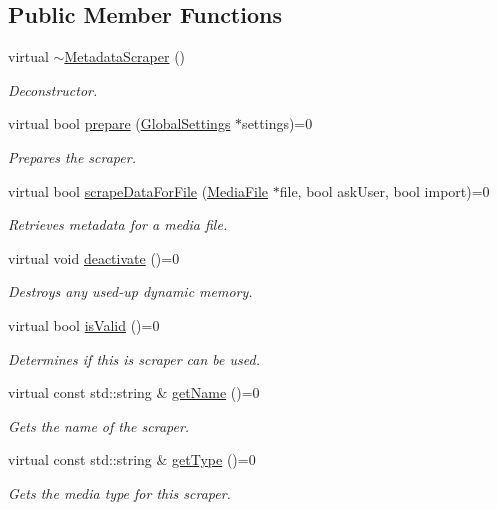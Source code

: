\subsection*{Public Member Functions}
\begin{DoxyCompactItemize}
\item 
\hypertarget{class_a_w_e_1_1_metadata_scraper_a0a7ae0178e838b07bbd960be7c9e7dac}{virtual \hyperlink{class_a_w_e_1_1_metadata_scraper_a0a7ae0178e838b07bbd960be7c9e7dac}{$\sim$\-Metadata\-Scraper} ()}\label{class_a_w_e_1_1_metadata_scraper_a0a7ae0178e838b07bbd960be7c9e7dac}

\begin{DoxyCompactList}\small\item\em Deconstructor. \end{DoxyCompactList}\item 
virtual bool \hyperlink{class_a_w_e_1_1_metadata_scraper_a92f9039770add633140b825bf41bc30a}{prepare} (\hyperlink{class_a_w_e_1_1_global_settings}{Global\-Settings} $\ast$settings)=0
\begin{DoxyCompactList}\small\item\em Prepares the scraper. \end{DoxyCompactList}\item 
virtual bool \hyperlink{class_a_w_e_1_1_metadata_scraper_a509832b172ce67e5e9788134016481b3}{scrape\-Data\-For\-File} (\hyperlink{class_a_w_e_1_1_media_file}{Media\-File} $\ast$file, bool ask\-User, bool import)=0
\begin{DoxyCompactList}\small\item\em Retrieves metadata for a media file. \end{DoxyCompactList}\item 
virtual void \hyperlink{class_a_w_e_1_1_metadata_scraper_a9a90e9974be775dff73c004ada209cb0}{deactivate} ()=0
\begin{DoxyCompactList}\small\item\em Destroys any used-\/up dynamic memory. \end{DoxyCompactList}\item 
virtual bool \hyperlink{class_a_w_e_1_1_metadata_scraper_a06f9da8e43ac52378ec15fc849e42eb8}{is\-Valid} ()=0
\begin{DoxyCompactList}\small\item\em Determines if this is scraper can be used. \end{DoxyCompactList}\item 
virtual const std\-::string \& \hyperlink{class_a_w_e_1_1_metadata_scraper_a375745d101342f062a1a3eb89a63ec6b}{get\-Name} ()=0
\begin{DoxyCompactList}\small\item\em Gets the name of the scraper. \end{DoxyCompactList}\item 
virtual const std\-::string \& \hyperlink{class_a_w_e_1_1_metadata_scraper_a02549221a803b624300ea6994be1b1a2}{get\-Type} ()=0
\begin{DoxyCompactList}\small\item\em Gets the media type for this scraper. \end{DoxyCompactList}\end{DoxyCompactItemize}


